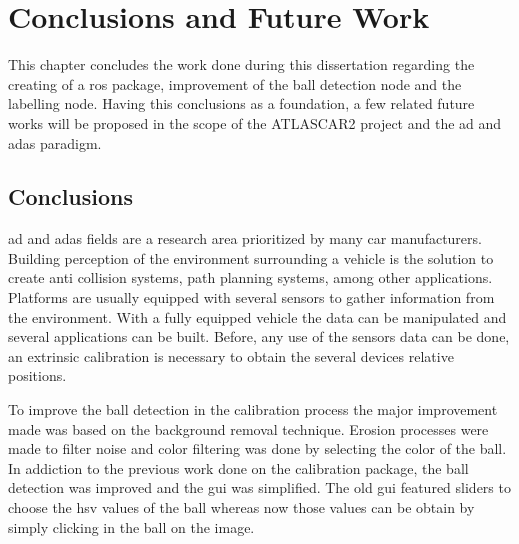 
\chapter{Conclusions and Future Work}

This chapter concludes the work done during this dissertation regarding the creating of a \gls{ros} package, improvement of the ball detection node and the labelling node. Having this conclusions as a foundation, a few related future works will be proposed in the scope of the ATLASCAR2 project and the \gls{ad} and \gls{adas} paradigm.

\section{Conclusions}

\gls{ad} and \gls{adas} fields are a research area prioritized by many car manufacturers. Building perception of the environment surrounding a vehicle is the solution to create anti collision systems, path planning systems, among other applications. Platforms are usually equipped with several sensors to gather information from the environment. With a fully equipped vehicle the data can be manipulated and several applications can be built. Before, any use of the sensors data can be done, an extrinsic calibration is necessary to obtain the several devices relative positions. 

To improve the ball detection in the calibration process the major improvement made was based on the background removal technique. Erosion processes were made to filter noise and color filtering was done by selecting the color of the ball. In addiction to the previous work done on the calibration package, the ball detection was improved and the \gls{gui} was simplified. The old \gls{gui} featured sliders to choose the \gls{hsv} values of the ball whereas now those values can be obtain by simply clicking in the ball on the image.

